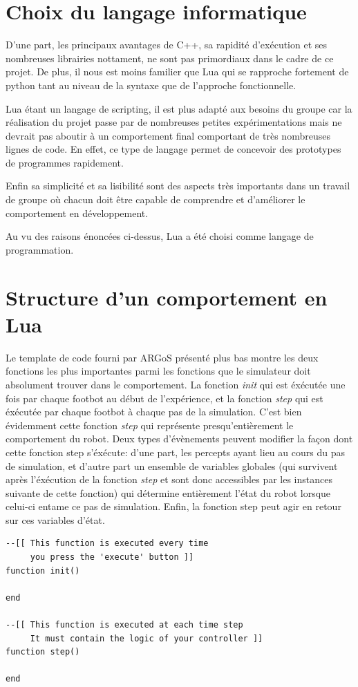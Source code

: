 \section{Choix du langage informatique}

D'une part, les principaux avantages de C++, sa rapidité d'exécution et ses nombreuses librairies nottament, ne sont pas primordiaux dans le cadre de ce projet. De plus, il nous est moins familier que Lua qui se rapproche fortement de python tant au niveau de la syntaxe que de l'approche fonctionnelle.

Lua étant un langage de scripting, il est plus adapté aux besoins du groupe car la réalisation du projet passe par de nombreuses petites expérimentations mais ne devrait pas aboutir à un comportement final comportant de très nombreuses lignes de code. En effet, ce type de langage permet de concevoir des prototypes de programmes rapidement.

Enfin sa simplicité et sa lisibilité sont des aspects très importants dans un travail de groupe où chacun doit être capable de comprendre et d'améliorer le comportement en développement.~\cite{compC++,compLua}

Au vu des raisons énoncées ci-dessus, Lua a été choisi comme langage de programmation.

\section{Structure d'un comportement en Lua}

Le template de code fourni par ARGoS présenté plus bas montre les deux fonctions les plus importantes parmi les fonctions que le simulateur doit absolument trouver dans le comportement. La fonction \emph{init} qui est éxécutée une fois par chaque footbot au début de l'expérience, et la fonction \emph{step} qui est éxécutée par chaque footbot à chaque pas de la simulation. C'est bien évidemment cette fonction \emph{step} qui représente presqu'entièrement le comportement du robot. Deux types d'évènements peuvent modifier la façon dont cette fonction step s'éxécute: d'une part, les percepts ayant lieu au cours du pas de simulation, et d'autre part un ensemble de variables globales (qui survivent après l'éxécution de la fonction \emph{step} et sont donc accessibles par les instances suivante de cette fonction) qui détermine entièrement l'état du robot lorsque celui-ci entame ce pas de simulation. Enfin, la fonction step peut agir en retour sur ces variables d'état.~\cite{argosSite1}
\begin{lstlisting}[caption=Structure de base d'un comportement en Lua]
--[[ This function is executed every time
     you press the 'execute' button ]]
function init()

end

--[[ This function is executed at each time step
     It must contain the logic of your controller ]]
function step()

end
\end{lstlisting}

